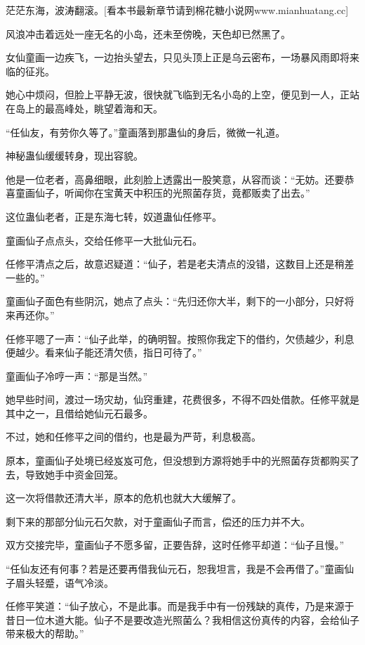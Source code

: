 
\begin{this_body}

茫茫东海，波涛翻滚。[看本书最新章节请到棉花糖小说网www.mianhuatang.cc]

风浪冲击着远处一座无名的小岛，还未至傍晚，天色却已然黑了。

女仙童画一边疾飞，一边抬头望去，只见头顶上正是乌云密布，一场暴风雨即将来临的征兆。

她心中烦闷，但脸上平静无波，很快就飞临到无名小岛的上空，便见到一人，正站在岛上的最高峰处，眺望着海和天。

“任仙友，有劳你久等了。”童画落到那蛊仙的身后，微微一礼道。

神秘蛊仙缓缓转身，现出容貌。

他是一位老者，高鼻细眼，此刻脸上透露出一股笑意，从容而谈：“无妨。还要恭喜童画仙子，听闻你在宝黄天中积压的光照菌存货，竟都贩卖了出去。”

这位蛊仙老者，正是东海七转，奴道蛊仙任修平。

童画仙子点点头，交给任修平一大批仙元石。

任修平清点之后，故意迟疑道：“仙子，若是老夫清点的没错，这数目上还是稍差一些的。”

童画仙子面色有些阴沉，她点了点头：“先归还你大半，剩下的一小部分，只好将来再还你。”

任修平嗯了一声：“仙子此举，的确明智。按照你我定下的借约，欠债越少，利息便越少。看来仙子能还清欠债，指日可待了。”

童画仙子冷哼一声：“那是当然。”

她早些时间，渡过一场灾劫，仙窍重建，花费很多，不得不四处借款。任修平就是其中之一，且借给她仙元石最多。

不过，她和任修平之间的借约，也是最为严苛，利息极高。

原本，童画仙子处境已经岌岌可危，但没想到方源将她手中的光照菌存货都购买了去，导致她手中资金回笼。

这一次将借款还清大半，原本的危机也就大大缓解了。

剩下来的那部分仙元石欠款，对于童画仙子而言，偿还的压力并不大。

双方交接完毕，童画仙子不愿多留，正要告辞，这时任修平却道：“仙子且慢。”

“任仙友还有何事？若是还要再借我仙元石，恕我坦言，我是不会再借了。”童画仙子眉头轻蹙，语气冷淡。

任修平笑道：“仙子放心，不是此事。而是我手中有一份残缺的真传，乃是来源于昔日一位木道大能。仙子不是要改造光照菌么？我相信这份真传的内容，会给仙子带来极大的帮助。”


\end{this_body}
